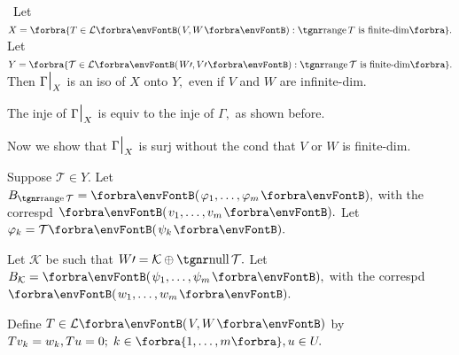 \Comment \,\,\,Let $X=\Bra{T\in\Lm{V,W}:\range T\text{ is finite-dim}}.$\parCom
Let $Y=\Bra{\mathcal{T}\in\Lm{W\apostrophe,V\apostrophe}:\range\mathcal{T}\text{ is finite-dim}}.$\parCom
Then $\Gamma\text{\Large|}_X$ is an iso of $X$ onto $Y,$ even if $V$ and $W$ are infinite-dim.\par\quad
{\tgsl The inje of $\Gamma\text{\Large|}_X$ is equiv to the inje of $\Gamma,$ as shown before.}\par\quad
{\tgsl Now we show that $\Gamma\text{\Large|}_X$ is surj without the cond that $V$ or $W$ is finite-dim.}\par\quad
Suppose $\mathcal{T}\in Y.$ Let $B_{\range\mathcal{T}}=\Par{\varphi_1,\dots,\varphi_m},$ with the correspd $\Par{v_1,\dots,v_m}.$ Let $\varphi_k=\mathcal{T}\Par{\psi_k}.$\par\quad
Let $\mathcal{K}$ be such that $W\apostrophe=\mathcal{K}\oplus\null\mathcal{T}.$ Let $B_{\mathcal{K}}=\Par{\psi_1,\dots,\psi_m},$ with the correspd $\Par{w_1,\dots,w_m}.$\par\quad
Define $T\in\Lm{V,W}$ by $Tv_k=w_k,Tu=0;\;k\in\Bra{1,\dots,m},u\in U.$\par\quad
